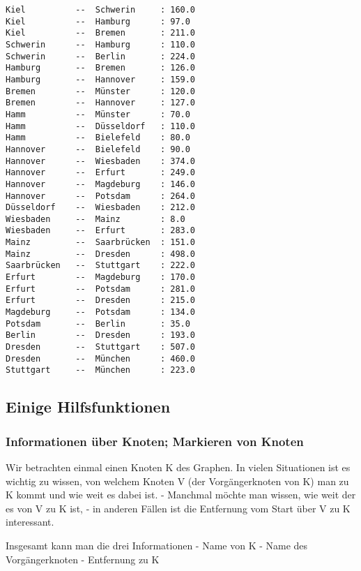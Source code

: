 \documentclass[11pt]{article}
\begin{document}
    \begin{Verbatim}[commandchars=\\\{\}]
Kiel          --  Schwerin     : 160.0
Kiel          --  Hamburg      : 97.0
Kiel          --  Bremen       : 211.0
Schwerin      --  Hamburg      : 110.0
Schwerin      --  Berlin       : 224.0
Hamburg       --  Bremen       : 126.0
Hamburg       --  Hannover     : 159.0
Bremen        --  Münster      : 120.0
Bremen        --  Hannover     : 127.0
Hamm          --  Münster      : 70.0
Hamm          --  Düsseldorf   : 110.0
Hamm          --  Bielefeld    : 80.0
Hannover      --  Bielefeld    : 90.0
Hannover      --  Wiesbaden    : 374.0
Hannover      --  Erfurt       : 249.0
Hannover      --  Magdeburg    : 146.0
Hannover      --  Potsdam      : 264.0
Düsseldorf    --  Wiesbaden    : 212.0
Wiesbaden     --  Mainz        : 8.0
Wiesbaden     --  Erfurt       : 283.0
Mainz         --  Saarbrücken  : 151.0
Mainz         --  Dresden      : 498.0
Saarbrücken   --  Stuttgart    : 222.0
Erfurt        --  Magdeburg    : 170.0
Erfurt        --  Potsdam      : 281.0
Erfurt        --  Dresden      : 215.0
Magdeburg     --  Potsdam      : 134.0
Potsdam       --  Berlin       : 35.0
Berlin        --  Dresden      : 193.0
Dresden       --  Stuttgart    : 507.0
Dresden       --  München      : 460.0
Stuttgart     --  München      : 223.0
    \end{Verbatim}

    \hypertarget{einige-hilfsfunktionen}{%
\subsection{Einige Hilfsfunktionen}\label{einige-hilfsfunktionen}}

    \hypertarget{informationen-uxfcber-knoten-markieren-von-knoten}{%
\subsubsection{Informationen über Knoten; Markieren von
Knoten}\label{informationen-uxfcber-knoten-markieren-von-knoten}}

    Wir betrachten einmal einen Knoten K des Graphen. In vielen Situationen
ist es wichtig zu wissen, von welchem Knoten V (der Vorgängerknoten von
K) man zu K kommt und wie weit es dabei ist. - Manchmal möchte man
wissen, wie weit der es von V zu K ist, - in anderen Fällen ist die
Entfernung vom Start über V zu K interessant.

Insgesamt kann man die drei Informationen - Name von K - Name des
Vorgängerknoten - Entfernung zu K
\end{document}
